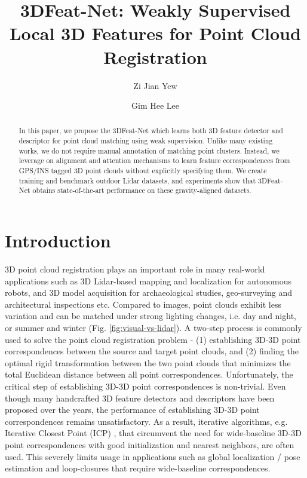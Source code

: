 \documentclass[runningheads]{llncs}
\begin{document}
\title{3DFeat-Net: Weakly Supervised Local 3D Features for Point Cloud Registration} 


\author{Zi Jian Yew \and Gim Hee Lee}

\maketitle

\begin{abstract}
In this paper, we propose the 3DFeat-Net which learns both 3D feature detector and descriptor for point cloud matching using weak supervision. Unlike many existing works, we do not require manual annotation of matching point clusters. Instead, we leverage on alignment and attention mechanisms to learn feature correspondences from GPS/INS tagged 3D point clouds without explicitly specifying them. We create training and benchmark outdoor Lidar datasets, and experiments show that 3DFeat-Net obtains state-of-the-art performance on these gravity-aligned datasets.
\end{abstract}


\section{Introduction}

3D point cloud registration plays an important role in many real-world applications such as 3D Lidar-based mapping and localization for autonomous robots, and 3D model acquisition for archaeological studies, geo-surveying and architectural inspections etc. Compared to images, point clouds exhibit less variation and can be matched under strong lighting changes, i.e. day and night, or summer and winter (Fig. \ref{fig:visual-vs-lidar}).
A two-step process is commonly used to solve the point cloud registration problem - (1) establishing 3D-3D point correspondences between the source and target point clouds, and (2) finding the optimal rigid transformation between the two point clouds that minimizes the total Euclidean distance between all point correspondences. Unfortunately, the critical step of establishing 3D-3D point correspondences is non-trivial. Even though many handcrafted 3D feature detectors \cite{ISS,LSP} and descriptors \cite{PFH,FPFH,SpinImage,USC,SHOT} have been proposed over the years, the performance of establishing 3D-3D point correspondences remains unsatisfactory. As a result, iterative algorithms, e.g. Iterative Closest Point (ICP) \cite{ICP}, that circumvent the need for wide-baseline 3D-3D point correspondences with good initialization and nearest neighbors, are often used. This severely limits usage in applications such as global localization / pose estimation \cite{LeePose15} and loop-closures \cite{dube2016segmatch} that require wide-baseline correspondences.
\end{document}
